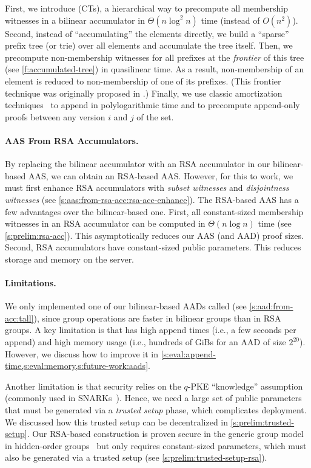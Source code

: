 First, we introduce \textit{\communionTrees} (CTs), a hierarchical way to precompute all membership witnesses in a bilinear accumulator in $\Theta(n\log^2{n})$ time (instead of $O(n^2)$).
Second, instead of ``accumulating'' the elements directly, we build a ``sparse'' prefix tree (or trie) over all elements and accumulate the tree itself.
Then, we precompute non-membership witnesses for all prefixes at the \textit{frontier} of this tree (see \cref{f:accumulated-tree}) in quasilinear time.
As a result, non-membership of an element is reduced to non-membership of one of its prefixes.
(This frontier technique was originally proposed in \cite{zks}.)
Finally, we use classic amortization techniques~\cite{overmars,overmars-van-leeuwen} to append in polylogarithmic time and to precompute append-only proofs between any version $i$ and $j$ of the set.

\paragraph{AAS From RSA Accumulators.}
By replacing the bilinear accumulator with an RSA accumulator in our bilinear-based AAS, we can obtain an RSA-based AAS.
However, for this to work, we must first enhance RSA accumulators with \textit{subset witnesses} and \textit{disjointness witnesses} (see \cref{s:aas:from-rsa-acc:rsa-acc-enhance}).
The RSA-based AAS has a few advantages over the bilinear-based one.
First, all constant-sized membership witnesses in an RSA accumulator can be computed in $\Theta(n\log{n})$ time (see \cref{s:prelim:rsa-acc}).
This asymptotically reduces our AAS (and AAD) proof sizes.
Second, RSA accumulators have constant-sized public parameters.
This reduces storage and memory on the server.

\paragraph{Limitations.}
We only implemented one of our bilinear-based AADs called \biaad (see \cref{s:aad:from-acc:tall}), since group operations are faster in bilinear groups than in RSA groups.
A key limitation is that \biaad has high append times (i.e., a few seconds per append) and high memory usage (i.e., hundreds of GiBs for an AAD of size $2^{20}$).
However, we discuss how to improve it in \cref{s:eval:append-time,s:eval:memory,s:future-work:aads}.

Another limitation is that \biaad security relies on the $q$-PKE ``knowledge'' assumption (commonly used in SNARKs~\cite{groth10,GentryWichs2011}).
Hence, we need a large set of public parameters that must be generated via a \textit{trusted setup} phase, which complicates deployment.
We discussed how this trusted setup can be decentralized in \cref{s:prelim:trusted-setup}.
Our RSA-based construction is proven secure in the generic group model in hidden-order groups~\cite{DK02} but only requires constant-sized parameters, which must also be generated via a trusted setup (see \cref{s:prelim:trusted-setup-rsa}).

